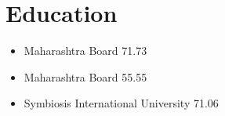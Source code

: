 \documentclass{article}
\begin{document}
    \section{Education}
    \begin{itemize}
    \item Maharashtra Board  71.73 

    \item  Maharashtra Board 55.55 

    \item  Symbiosis International University  71.06 
    \end{itemize}
\end{document}
